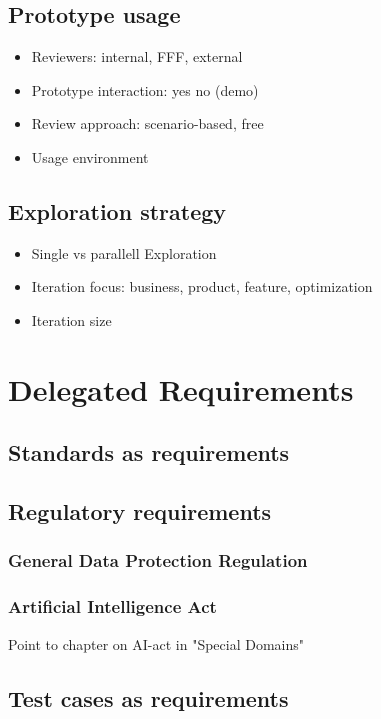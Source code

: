 \documentclass{reqengbook}
\begin{document}
\section{Prototype usage}
\begin{itemize}
  \item Reviewers: internal, FFF, external
  \item Prototype interaction: yes no (demo)
  \item Review approach: scenario-based, free
  \item Usage environment
\end{itemize}

\section{Exploration strategy}
\begin{itemize}
  \item Single vs parallell Exploration
  \item Iteration focus: business, product, feature, optimization
  \item Iteration size
\end{itemize}


\chapter{Delegated Requirements}

\section{Standards as requirements}

\section{Regulatory requirements}

\subsection{General Data Protection Regulation} 

\subsection{Artificial Intelligence Act}
Point to chapter on AI-act in "Special Domains"

\section{Test cases as requirements}
\end{document}
